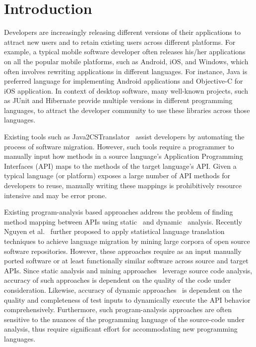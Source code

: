 \section{Introduction}
\label{sec:introduction}


Developers are increasingly releasing different versions of their applications to attract new users and to retain existing users across different platforms.
For example, a typical mobile software developer often releases his/her applications
on all the popular mobile platforms, such as Android, iOS, and Windows,
which often involves rewriting applications in different languages.
For instance, Java is preferred language for implementing Android applications
and Objective-C for iOS application.
In context of desktop software, many well-known projects, such as JUnit and
Hibernate provide multiple versions in different programming languages,
to attract the developer community to use these
libraries across those languages.



Existing tools such as Java2CSTranslator~\cite{java2cstranslator}
assist developers by automating the process of software migration.
However, such tools require a programmer to manually input
how methods in a source language's Application Programming Interfaces (API) maps to the methods of the target language's API. 
Given a typical language (or platform) exposes a large number of API methods for developers to reuse, manually writing these mappings is prohibitively resource intensive and may be error prone.


Existing program-analysis based approaches
address the problem of finding method mapping between APIs using
static~\cite{Zhong2010ICSE} and dynamic~\cite{Gokhale2013ICSE} analysis. 
Recently Nguyen et al.~\cite{nguyen2014statistical} further proposed to
apply statistical language translation techniques to achieve language migration
by mining large corpora of open source software repositories.
However, these approaches require as an input manually ported software
or at least functionally similar software across source and target APIs.
Since static analysis and mining approaches~\cite{Zhong2010ICSE,nguyen2014statistical}
leverage source code analysis, 
accuracy of such approaches is dependent on the quality of the code under consideration.
Likewise, accuracy of dynamic approaches~\cite{Gokhale2013ICSE} is dependent on
the quality and completeness of test inputs
to dynamically execute the API behavior comprehensively. 
Furthermore, such program-analysis approaches are often sensitive to the nuances of
the programming language of the source-code under analysis, thus require significant effort
for accommodating new programming languages.  


